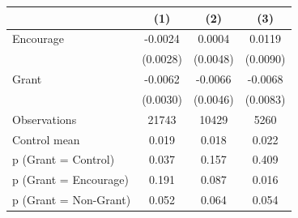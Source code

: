 \begin{tabular*}{\hsize}{@{\hskip\tabcolsep\extracolsep\fill}l*{3}{c}}
\toprule
                    &\multicolumn{1}{c}{(1)}&\multicolumn{1}{c}{(2)}&\multicolumn{1}{c}{(3)}\\
\midrule
Encourage           &     -0.0024&      0.0004&      0.0119\\
                    &    (0.0028)&    (0.0048)&    (0.0090)\\
\addlinespace
Grant               &     -0.0062&     -0.0066&     -0.0068\\
                    &    (0.0030)&    (0.0046)&    (0.0083)\\
\midrule
Observations        &       21743&       10429&        5260\\
Control mean        &       0.019&       0.018&       0.022\\
p (Grant = Control) &       0.037&       0.157&       0.409\\
p (Grant = Encourage)&       0.191&       0.087&       0.016\\
p (Grant = Non-Grant)&       0.052&       0.064&       0.054\\
\bottomrule
\end{tabular*}
